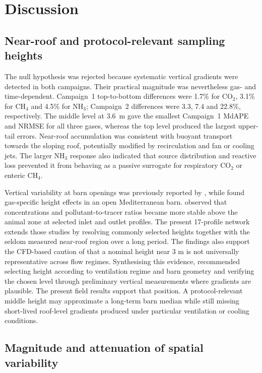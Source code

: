 \documentclass[12pt,a4paper]{article}
\begin{document}
\section{Discussion}

\subsection{Near-roof and protocol-relevant sampling heights}

The null hypothesis was rejected because systematic vertical gradients were detected in both campaigns. Their practical magnitude was nevertheless gas- and time-dependent. Campaign~1 top-to-bottom differences were 1.7\% for \(\mathrm{CO_2}\), 3.1\% for \(\mathrm{CH_4}\) and 4.5\% for \(\mathrm{NH_3}\); Campaign~2 differences were 3.3, 7.4 and 22.8\%, respectively. The middle level at \SI{3.6}{m} gave the smallest Campaign~1 MdAPE and NRMSE for all three gases, whereas the top level produced the largest upper-tail errors. Near-roof accumulation was consistent with buoyant transport towards the sloping roof, potentially modified by recirculation and fan or cooling jets. The larger \(\mathrm{NH_3}\) response also indicated that source distribution and reactive loss prevented it from behaving as a passive surrogate for respiratory \(\mathrm{CO_2}\) or enteric \(\mathrm{CH_4}\).

Vertical variability at barn openings was previously reported by \citet{Sahu2023}, while \citet{Durso2024} found gas-specific height effects in an open Mediterranean barn. \citet{Mendes2015} observed that concentrations and pollutant-to-tracer ratios became more stable above the animal zone at selected inlet and outlet profiles. The present 17-profile network extends those studies by resolving commonly selected heights together with the seldom measured near-roof region over a long period. The findings also support the CFD-based caution of \citet{Doumbia2021} that a nominal height near 3 m is not universally representative across flow regimes. Synthesising this evidence, \citet{Apostolico2026} recommended selecting height according to ventilation regime and barn geometry and verifying the chosen level through preliminary vertical measurements where gradients are plausible. The present field results support that position. A protocol-relevant middle height may approximate a long-term barn median while still missing short-lived roof-level gradients produced under particular ventilation or cooling conditions.

\subsection{Magnitude and attenuation of spatial variability}
\end{document}

